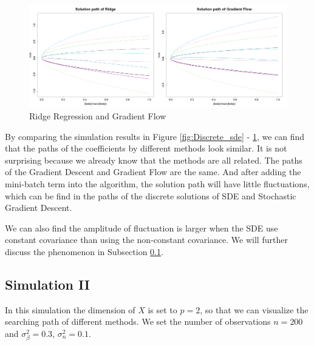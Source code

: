 \documentclass[11pt]{article}
\begin{document}
\begin{figure}[ht]
\centering
\includegraphics[width=1\linewidth]{fig5.png}
\caption{Ridge Regression and Gradient Flow}
\label{fig:ridge}
\end{figure}

By comparing the simulation results in Figure \ref{fig:Discrete_sde} - \ref{fig:ridge}, we can find that the paths of the coefficients by different methods look similar. It is not surprising because we already know that the methods are all related. The paths of the Gradient Descent and Gradient Flow are the same. And after adding the mini-batch term into the algorithm, the solution path will have little fluctuations, which can be find in the paths of the discrete solutions of SDE and Stochastic Gradient Descent.

We can also find the amplitude of fluctuation is larger when the SDE use constant covariance than using the non-constant covariance. We will further discuss the phenomenon in Subsection \ref{simu2}.

\subsection{Simulation II} \label{simu2}

In this simulation the dimension of $X$ is set to $p=2$, so that we can visualize the searching path of different methods. We set the number of observations $n=200$ and $\sigma^2_{\beta} = 0.3$, $\sigma^2_{n} = 0.1$.
\end{document}
